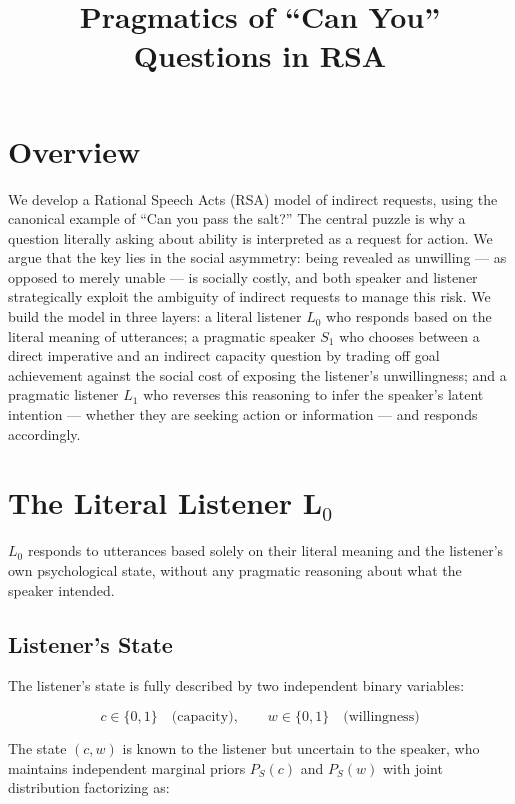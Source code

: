 \documentclass[12pt]{article}
\title{Pragmatics of ``Can You'' Questions in RSA}
\date{}
\begin{document}
\maketitle

\section{Overview}

We develop a Rational Speech Acts (RSA) model of indirect requests, using the canonical example of ``Can you pass the salt?'' The central puzzle is why a question literally asking about ability is interpreted as a request for action. We argue that the key lies in the social asymmetry: being revealed as unwilling --- as opposed to merely unable --- is socially costly, and both speaker and listener strategically exploit the ambiguity of indirect requests to manage this risk. We build the model in three layers: a literal listener $L_0$ who responds based on the literal meaning of utterances; a pragmatic speaker $S_1$ who chooses between a direct imperative and an indirect capacity question by trading off goal achievement against the social cost of exposing the listener's unwillingness; and a pragmatic listener $L_1$ who reverses this reasoning to infer the speaker's latent intention --- whether they are seeking action or information --- and responds accordingly.


\section{The Literal Listener L$_0$}

$L_0$ responds to utterances
based solely on their literal meaning and the listener's own
psychological state, without any pragmatic reasoning about what the
speaker intended.

\subsection{Listener's State}

The listener's state is fully described by two independent binary
variables:

\[
c \in \{0, 1\} \quad \text{(capacity)}, \qquad w \in \{0, 1\} \quad
\text{(willingness)}
\]

The state $(c, w)$ is known to the listener but uncertain to the
speaker, who maintains independent marginal priors $P_S(c)$ and
$P_S(w)$ with joint distribution factorizing as:
\end{document}
